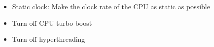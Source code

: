 \begin{itemize}
    \item Static clock: Make the clock rate of the CPU as static as possible
    \item Turn off CPU turbo boost
    \item Turn off hyperthreading
\end{itemize}